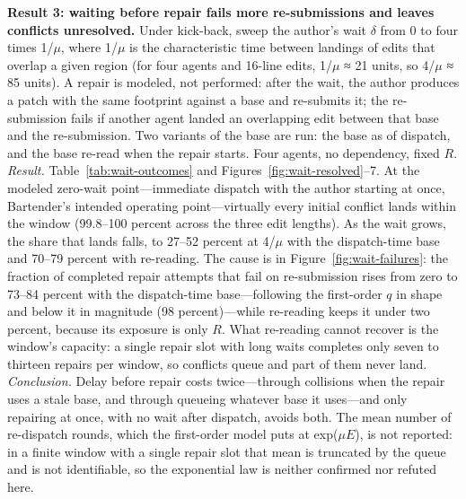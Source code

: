 \documentclass[pdflatex,sn-mathphys-ay]{sn-jnl}
\theoremstyle{thmstyleone}
\theoremstyle{thmstylethree}
\begin{document}
\textbf{Result 3: waiting before repair fails more re-submissions and leaves conflicts unresolved.} Under kick-back, sweep the author's wait \(\delta\) from 0 to four times 1/\(\mu\), where 1/\(\mu\) is the characteristic time between landings of edits that overlap a given region (for four agents and 16-line edits, 1/\(\mu\) ≈ 21 units, so 4/\(\mu\) ≈ 85 units). A repair is modeled, not performed: after the wait, the author produces a patch with the same footprint against a base and re-submits it; the re-submission fails if another agent landed an overlapping edit between that base and the re-submission. Two variants of the base are run: the base as of dispatch, and the base re-read when the repair starts. Four agents, no dependency, fixed \(R\). \emph{Result.} Table~\ref{tab:wait-outcomes} and Figures~\ref{fig:wait-resolved}--7. At the modeled zero-wait point---immediate dispatch with the author starting at once, Bartender's intended operating point---virtually every initial conflict lands within the window (99.8--100 percent across the three edit lengths). As the wait grows, the share that lands falls, to 27--52 percent at 4/\(\mu\) with the dispatch-time base and 70--79 percent with re-reading. The cause is in Figure~\ref{fig:wait-failures}: the fraction of completed repair attempts that fail on re-submission rises from zero to 73--84 percent with the dispatch-time base---following the first-order \(q\) in shape and below it in magnitude (98 percent)---while re-reading keeps it under two percent, because its exposure is only \(R\). What re-reading cannot recover is the window's capacity: a single repair slot with long waits completes only seven to thirteen repairs per window, so conflicts queue and part of them never land. \emph{Conclusion.} Delay before repair costs twice---through collisions when the repair uses a stale base, and through queueing whatever base it uses---and only repairing at once, with no wait after dispatch, avoids both. The mean number of re-dispatch rounds, which the first-order model puts at exp(\(\mu E\)), is not reported: in a finite window with a single repair slot that mean is truncated by the queue and is not identifiable, so the exponential law is neither confirmed nor refuted here.
\end{document}
